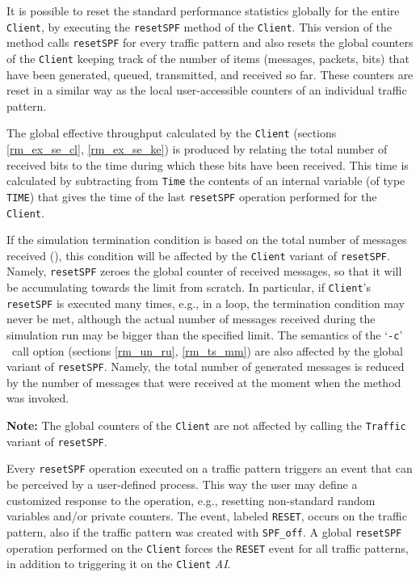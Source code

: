 It is possible to reset the standard performance statistics globally
for the entire {\tt Client}, by executing the {\tt resetSPF} method
of the {\tt Client}.
This version of the method calls {\tt resetSPF} for every traffic
pattern and also resets the global counters of the {\tt Client}
keeping track of the number of items (messages, packets, bits) that
have been generated, queued, transmitted, and received so far.
These counters are reset in a similar way as the local user-accessible
counters of an individual traffic pattern.

The global effective throughput calculated by the {\tt Client}
(sections \ref{rm_ex_se_cl}, \ref{rm_ex_se_ke}) is produced by
relating the total number of received bits to the time during
which these bits have been received.
This time is calculated by subtracting from {\tt Time} the
contents of an internal
variable (of type {\tt TIME}) that gives the time of the last
{\tt resetSPF} operation performed for the {\tt Client}.

If the simulation termination condition is based on the total
number of messages received (), this condition
will be affected by the {\tt Client} variant of {\tt resetSPF}.
Namely, {\tt resetSPF} zeroes the global counter of received messages,
so that it will be accumulating towards the limit from scratch.
In particular, if {\tt Client}'s {\tt resetSPF} is executed many
times, e.g., in a loop, the termination condition may never be met,
although the actual number of messages received during the simulation
run may be bigger than the specified limit.
The semantics of the `{\tt -c}' \smurph\ call option (sections \ref{rm_un_ru},
\ref{rm_ts_mm}) are also affected by the global variant of {\tt resetSPF}.
Namely, the total number of generated messages is reduced by the
number of messages that were received at the moment when the method
was invoked.

\medskip

\noindent
{\bf Note:} The global counters of the {\tt Client} are not affected
by calling the {\tt Traffic} variant of {\tt resetSPF}.

\medskip

Every {\tt resetSPF} operation executed on a traffic pattern triggers an event
that can be perceived by a user-defined process.
This way the user may define a customized response to the operation, e.g.,
resetting non-standard random variables and/or private counters.
The event, labeled {\tt RESET}, occurs on the traffic pattern, also if the
traffic pattern was created with {\tt SPF\_off}.
A global {\tt resetSPF} operation performed on the {\tt Client} forces the
{\tt RESET} event for all traffic patterns, in addition to triggering it
on the {\tt Client} {\em AI}.

